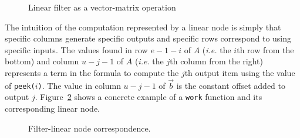 \begin{figure}[t]
\vspace{-6pt}
\center
\epsfxsize=3.0in
\vspace{-12pt}
\caption{Linear filter as a vector-matrix operation}
\label{fig:overview-matrix}
\vspace{-6pt}
\end{figure}

The intuition of the computation represented by a linear node is
simply that specific columns generate specific outputs and specific
rows correspond to using specific inputs.  The values found in row
$e-1-i$ of $A$ ({\it i.e.} the $i$th row from the bottom) and 
column $u-j-1$ of $A$ ({\it i.e.} the $j$th column from the right) 
represents a term in the formula to compute the $j$th output item using 
the value of {\tt peek($i$)}. The value in column $u-j-1$ of 
$\vec{b}$ is the constant offset added to output $j$.
Figure~\ref{fig:linear-node-example} shows a concrete example
of a {\tt work} function and its corresponding linear node.

\begin{figure}
\center
\epsfxsize=2.0in
\vspace{-12pt}
\caption{Filter-linear node correspondence.}
\label{fig:linear-node-example}
\vspace{-12pt}
\end{figure}
